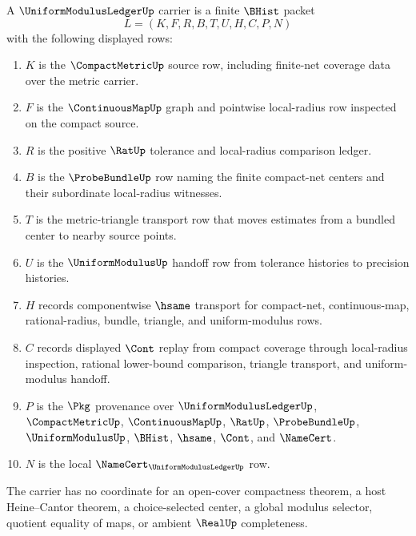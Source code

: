 \begin{definition}
\label{def:uniform-modulus-ledger-carrier}
A $\UniformModulusLedgerUp$ carrier is a finite $\BHist$ packet
$$
L=(K,F,R,B,T,U,H,C,P,N)
$$
with the following displayed rows:
\begin{enumerate}
\item $K$ is the $\CompactMetricUp$ source row, including finite-net coverage data over the metric carrier.
\item $F$ is the $\ContinuousMapUp$ graph and pointwise local-radius row inspected on the compact source.
\item $R$ is the positive $\RatUp$ tolerance and local-radius comparison ledger.
\item $B$ is the $\ProbeBundleUp$ row naming the finite compact-net centers and their subordinate local-radius witnesses.
\item $T$ is the metric-triangle transport row that moves estimates from a bundled center to nearby source points.
\item $U$ is the $\UniformModulusUp$ handoff row from tolerance histories to precision histories.
\item $H$ records componentwise $\hsame$ transport for compact-net, continuous-map, rational-radius, bundle, triangle, and uniform-modulus rows.
\item $C$ records displayed $\Cont$ replay from compact coverage through local-radius inspection, rational lower-bound comparison, triangle transport, and uniform-modulus handoff.
\item $P$ is the $\Pkg$ provenance over $\UniformModulusLedgerUp$, $\CompactMetricUp$, $\ContinuousMapUp$, $\RatUp$, $\ProbeBundleUp$, $\UniformModulusUp$, $\BHist$, $\hsame$, $\Cont$, and $\NameCert$.
\item $N$ is the local $\NameCert_{\UniformModulusLedgerUp}$ row.
\end{enumerate}
The carrier has no coordinate for an open-cover compactness theorem, a host Heine--Cantor theorem, a choice-selected center, a global modulus selector, quotient equality of maps, or ambient $\RealUp$ completeness.
\end{definition}

